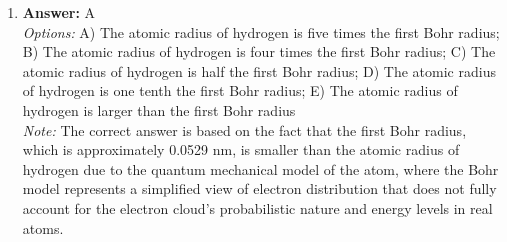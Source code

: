 \documentclass[12pt]{article}
\begin{document}
\begin{enumerate}[label=\arabic*.]
\item \textbf{Answer:} A
\\ \textit{Options:} A) The atomic radius of hydrogen is five times the first Bohr radius; B) The atomic radius of hydrogen is four times the first Bohr radius; C) The atomic radius of hydrogen is half the first Bohr radius; D) The atomic radius of hydrogen is one tenth the first Bohr radius; E) The atomic radius of hydrogen is larger than the first Bohr radius
\\ \textit{Note:} The correct answer is based on the fact that the first Bohr radius, which is approximately 0.0529 nm, is smaller than the atomic radius of hydrogen due to the quantum mechanical model of the atom, where the Bohr model represents a simplified view of electron distribution that does not fully account for the electron cloud's probabilistic nature and energy levels in real atoms.
\end{enumerate}
\end{document}
